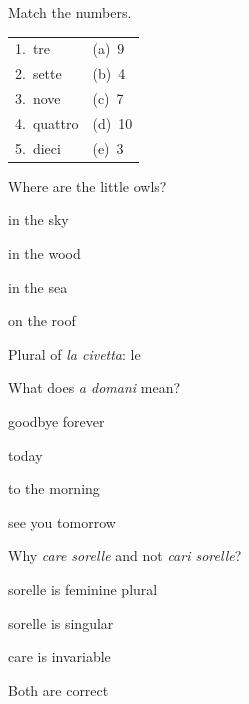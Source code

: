 \documentclass[11pt,a4paper,twoside,openright]{book}
\newcommand{\blank}{\underline{\hspace{2.6cm}}}
\begin{document}
\begin{exercises}
\item\label{ex:rhyme-conta-1}\relax Match the numbers.\par\smallskip\begin{tabularx}{\linewidth}{@{}L L@{}}
1.\ tre & (a)\ 9 \\
2.\ sette & (b)\ 4 \\
3.\ nove & (c)\ 7 \\
4.\ quattro & (d)\ 10 \\
5.\ dieci & (e)\ 3 \\
\end{tabularx}
\item\label{ex:rhyme-conta-2}\relax Where are the little owls?\par\nopagebreak\begin{options}
\item\relax in the sky
\item\relax in the wood
\item\relax in the sea
\item\relax on the roof
\end{options}
\item\label{ex:rhyme-conta-3}\relax Plural of \textit{la civetta}: le \blank{}
\item\label{ex:rhyme-conta-4}\relax What does \textit{a domani} mean?\par\nopagebreak\begin{options}
\item\relax goodbye forever
\item\relax today
\item\relax to the morning
\item\relax see you tomorrow
\end{options}
\item\label{ex:rhyme-conta-5}\relax Why \textit{care sorelle} and not \textit{cari sorelle}?\par\nopagebreak\begin{options}
\item\relax sorelle is feminine plural
\item\relax sorelle is singular
\item\relax care is invariable
\item\relax Both are correct
\end{options}
\end{exercises}
\end{document}
